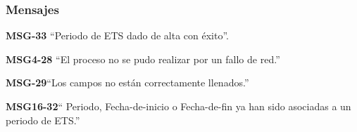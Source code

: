 \subsubsection{Mensajes}

\begin{Citemize}
    \item {\bf MSG-33} ``Periodo de ETS  dado de alta con éxito''.
    \item {\bf MSG4-28}  ``El proceso no se pudo realizar por un fallo de red.''
    \item {\bf MSG-29}{``Los campos no están correctamente llenados.''}
    \item {\bf MSG16-32}{`` Periodo, Fecha-de-inicio o Fecha-de-fin ya han sido asociadas a un periodo de ETS.''}
\end{Citemize}


